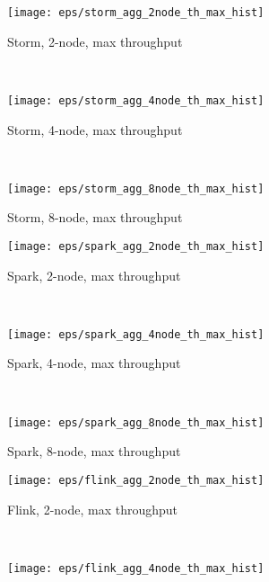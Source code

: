 \begin{figure*}
    \centering
    \begin{subfigure}[b]{0.3\textwidth}
        \texttt{[image: eps/storm\_agg\_2node\_th\_max\_hist]}

        \caption{Storm, 2-node, max  throughput }
    \end{subfigure}
    ~ 
    \begin{subfigure}[b]{0.3\textwidth}
        \texttt{[image: eps/storm\_agg\_4node\_th\_max\_hist]}

        \caption{Storm, 4-node, max   throughput }
    \end{subfigure}
    ~ 
    \begin{subfigure}[b]{0.3\textwidth}
        \texttt{[image: eps/storm\_agg\_8node\_th\_max\_hist]}

        \caption{Storm, 8-node, max  throughput }
        
    \end{subfigure}



    \begin{subfigure}[b]{0.3\textwidth}
        \texttt{[image: eps/spark\_agg\_2node\_th\_max\_hist]}

        \caption{Spark, 2-node, max  throughput }
    \end{subfigure}
    ~ 
    \begin{subfigure}[b]{0.3\textwidth}
        \texttt{[image: eps/spark\_agg\_4node\_th\_max\_hist]}

        \caption{Spark, 4-node, max  throughput }
    \end{subfigure}
    ~ 
    \begin{subfigure}[b]{0.3\textwidth}
        \texttt{[image: eps/spark\_agg\_8node\_th\_max\_hist]}

        \caption{Spark, 8-node, max  throughput }
        
    \end{subfigure}



    \begin{subfigure}[b]{0.3\textwidth}
        \texttt{[image: eps/flink\_agg\_2node\_th\_max\_hist]}

        \caption{Flink, 2-node, max  throughput }
    \end{subfigure}
    ~ 
    \begin{subfigure}[b]{0.3\textwidth}
        \texttt{[image: eps/flink\_agg\_4node\_th\_max\_hist]}


\end{subfigure}
\end{figure*}
